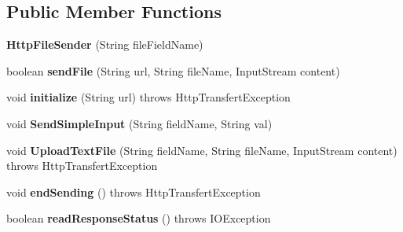 \subsection*{Public Member Functions}
\begin{DoxyCompactItemize}
\item 
\hypertarget{classcom_1_1qualoutdoor_1_1recorder_1_1network_1_1HttpFileSender_a11f7648713836c976e3575367d8ca453}{{\bfseries Http\-File\-Sender} (String file\-Field\-Name)}\label{classcom_1_1qualoutdoor_1_1recorder_1_1network_1_1HttpFileSender_a11f7648713836c976e3575367d8ca453}

\item 
\hypertarget{classcom_1_1qualoutdoor_1_1recorder_1_1network_1_1HttpFileSender_a59a5982ec999b0a3ab440b04a4009393}{boolean {\bfseries send\-File} (String url, String file\-Name, Input\-Stream content)}\label{classcom_1_1qualoutdoor_1_1recorder_1_1network_1_1HttpFileSender_a59a5982ec999b0a3ab440b04a4009393}

\item 
\hypertarget{classcom_1_1qualoutdoor_1_1recorder_1_1network_1_1HttpFileSender_ada86dd859c9ed7c9a42c3204ef25e57a}{void {\bfseries initialize} (String url)  throws Http\-Transfert\-Exception}\label{classcom_1_1qualoutdoor_1_1recorder_1_1network_1_1HttpFileSender_ada86dd859c9ed7c9a42c3204ef25e57a}

\item 
\hypertarget{classcom_1_1qualoutdoor_1_1recorder_1_1network_1_1HttpFileSender_ac812f32e9bc4358de7de95299ed87b98}{void {\bfseries Send\-Simple\-Input} (String field\-Name, String val)}\label{classcom_1_1qualoutdoor_1_1recorder_1_1network_1_1HttpFileSender_ac812f32e9bc4358de7de95299ed87b98}

\item 
\hypertarget{classcom_1_1qualoutdoor_1_1recorder_1_1network_1_1HttpFileSender_a7d79dca5495a2cba7e132bf90ced29d4}{void {\bfseries Upload\-Text\-File} (String field\-Name, String file\-Name, Input\-Stream content)  throws Http\-Transfert\-Exception}\label{classcom_1_1qualoutdoor_1_1recorder_1_1network_1_1HttpFileSender_a7d79dca5495a2cba7e132bf90ced29d4}

\item 
\hypertarget{classcom_1_1qualoutdoor_1_1recorder_1_1network_1_1HttpFileSender_a5fb6b983e742233d697de87fa49c1c26}{void {\bfseries end\-Sending} ()  throws Http\-Transfert\-Exception}\label{classcom_1_1qualoutdoor_1_1recorder_1_1network_1_1HttpFileSender_a5fb6b983e742233d697de87fa49c1c26}

\item 
\hypertarget{classcom_1_1qualoutdoor_1_1recorder_1_1network_1_1HttpFileSender_a4fe8efb84bab6c718a3a68024cc5d45a}{boolean {\bfseries read\-Response\-Status} ()  throws I\-O\-Exception}\label{classcom_1_1qualoutdoor_1_1recorder_1_1network_1_1HttpFileSender_a4fe8efb84bab6c718a3a68024cc5d45a}

\end{DoxyCompactItemize}
